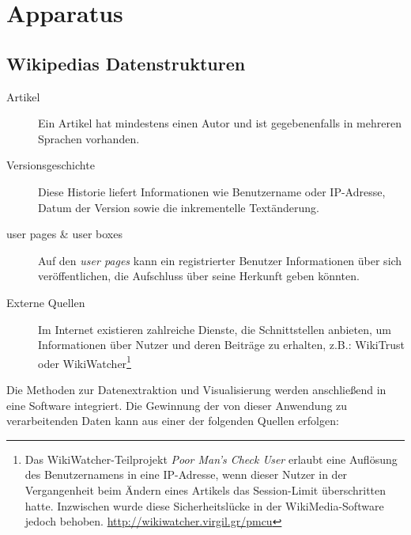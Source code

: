 \chapter{Apparatus}\label{ch:apparatus}




\section{Wikipedias Datenstrukturen}

\begin{description}
\item[Artikel] Ein Artikel hat mindestens einen Autor und ist gegebenenfalls in mehreren Sprachen vorhanden.
\item[Versionsgeschichte] Diese Historie liefert Informationen wie Benutzername oder IP-Adresse, Datum der Version sowie die inkrementelle Textänderung.
\item[user pages \& user boxes] Auf den \emph{user pages} kann ein registrierter Benutzer Informationen über sich veröffentlichen, die Aufschluss über seine Herkunft geben könnten.
\item[Externe Quellen] Im Internet existieren zahlreiche Dienste, die Schnittstellen anbieten, um Informationen über Nutzer und deren Beiträge zu erhalten, z.B.: WikiTrust oder WikiWatcher\footnote{Das WikiWatcher-Teilprojekt \emph{Poor Man's Check User} erlaubt eine Auflösung des Benutzernamens in eine IP-Adresse, wenn dieser Nutzer in der Vergangenheit beim Ändern eines Artikels das Session-Limit überschritten hatte. Inzwischen wurde diese Sicherheitslücke in der WikiMedia-Software jedoch behoben. \url{http://wikiwatcher.virgil.gr/pmcu}}
\end{description}

Die Methoden zur Datenextraktion und Visualisierung werden anschließend in eine Software integriert.
Die Gewinnung der von dieser Anwendung zu verarbeitenden Daten kann aus einer der folgenden Quellen erfolgen:

